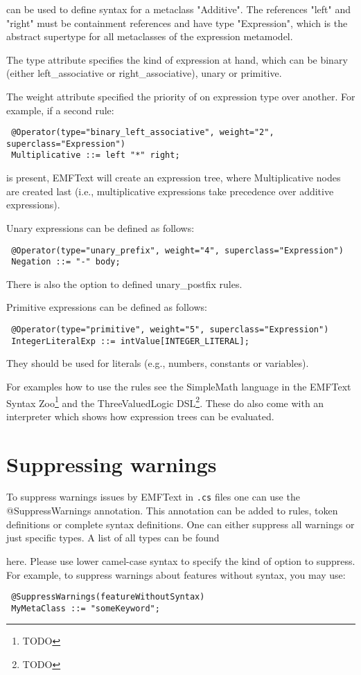 can be used to define syntax for a metaclass "Additive". The references "left"
and "right" must be containment references and have type "Expression", which is
the abstract supertype for all metaclasses of the expression metamodel.

The type attribute specifies the kind of expression at hand, which can be binary (either 
left\_associative or right\_associative), unary or primitive.

The weight attribute specified the priority of on expression type over another.
For example, if a second rule:

\begin{lstlisting}
 @Operator(type="binary_left_associative", weight="2", superclass="Expression")
 Multiplicative ::= left "*" right;
\end{lstlisting}

is present, EMFText will create an expression tree, where Multiplicative nodes are 
created last (i.e., multiplicative expressions take precedence over additive expressions).

Unary expressions can be defined as follows:

\begin{lstlisting}
 @Operator(type="unary_prefix", weight="4", superclass="Expression")	
 Negation ::= "-" body;
\end{lstlisting}

There is also the option to defined unary\_postfix rules.

Primitive expressions can be defined as follows:

\begin{lstlisting}
 @Operator(type="primitive", weight="5", superclass="Expression")
 IntegerLiteralExp ::= intValue[INTEGER_LITERAL];
\end{lstlisting}

They should be used for literals (e.g., numbers, constants or variables).

For examples how to use the \@Operator rules see the SimpleMath language in the
EMFText Syntax Zoo\footnote{TODO} and the ThreeValuedLogic DSL\footnote{TODO}. 
These do also come with an interpreter which shows how expression trees can be 
evaluated.

\section{Suppressing warnings}

To suppress warnings issues by EMFText in \texttt{.cs} files one can use the
@SuppressWarnings annotation. This annotation can be added to rules, token 
definitions or complete syntax definitions. One can either suppress all 
warnings or just specific types. A list of all types can be found 

here. Please use lower camel-case syntax to specify the kind of option to suppress. 
For example, to suppress warnings about features without syntax, you may use:

\begin{lstlisting}
 @SuppressWarnings(featureWithoutSyntax)
 MyMetaClass ::= "someKeyword";
\end{lstlisting}

